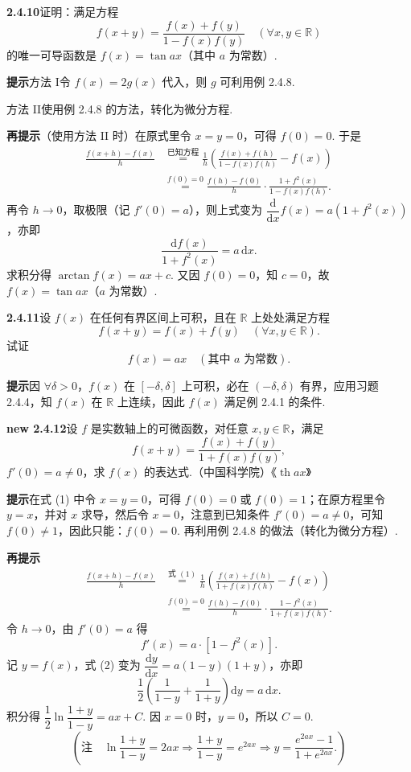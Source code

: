 \documentclass[UTF8,12pt,a4paper,fontset=fandol]{ctexart}
\begin{document}
\noindent\textbf{2.4.10}\quad 证明：满足方程
\[
  f(x+y)=\frac{f(x)+f(y)}{1-f(x)f(y)}\quad(\forall x,y\in\mathbb{R})
\]
的唯一可导函数是 $f(x)=\tan ax$（其中 $a$ 为常数）.

\noindent\textbf{提示}\quad 方法 I\quad 令 $f(x)=2g(x)$ 代入，则 $g$ 可利用例 2.4.8.

方法 II\quad 使用例 2.4.8 的方法，转化为微分方程.

\noindent\textbf{再提示}\quad （使用方法 II 时）在原式里令 $x=y=0$，可得 $f(0)=0$. 于是
\[
\begin{aligned}
\frac{f(x+h)-f(x)}{h}
&\overset{\text{已知方程}}{=}\frac1h\left(\frac{f(x)+f(h)}{1-f(x)f(h)}-f(x)\right)\\
&\overset{f(0)=0}{=}\frac{f(h)-f(0)}{h}\cdot\frac{1+f^2(x)}{1-f(x)f(h)}.
\end{aligned}
\]
再令 $h\to0$，取极限（记 $f'(0)=a$），则上式变为 $\dfrac{\mathrm{d}}{\mathrm{d}x}f(x)=a(1+f^2(x))$，亦即
\[
  \frac{\mathrm{d}f(x)}{1+f^2(x)}=a\,\mathrm{d}x.
\]
求积分得 $\arctan f(x)=ax+c$. 又因 $f(0)=0$，知 $c=0$，故 $f(x)=\tan ax$（$a$ 为常数）.

\noindent\textbf{2.4.11}\quad 设 $f(x)$ 在任何有界区间上可积，且在 $\mathbb{R}$ 上处处满足方程
\[
  f(x+y)=f(x)+f(y)\quad(\forall x,y\in\mathbb{R}).
\]
试证
\[
  f(x)=ax\quad(\text{其中 }a\text{ 为常数}).
\]

\noindent\textbf{提示}\quad 因 $\forall\delta>0$，$f(x)$ 在 $[-\delta,\delta]$ 上可积，必在 $(-\delta,\delta)$ 有界，应用习题 2.4.4，知 $f(x)$ 在 $\mathbb{R}$ 上连续，因此 $f(x)$ 满足例 2.4.1 的条件.

\noindent\textbf{new 2.4.12}\quad 设 $f$ 是实数轴上的可微函数，对任意 $x,y\in\mathbb{R}$，满足
\[
  f(x+y)=\frac{f(x)+f(y)}{1+f(x)f(y)}, \tag{1}
\]
$f'(0)=a\ne0$，求 $f(x)$ 的表达式.（中国科学院）\hfill《$\operatorname{th} ax$》

\noindent\textbf{提示}\quad 在式 (1) 中令 $x=y=0$，可得 $f(0)=0$ 或 $f(0)=1$；在原方程里令 $y=x$，并对 $x$ 求导，然后令 $x=0$，注意到已知条件 $f'(0)=a\ne0$，可知 $f(0)\ne1$，因此只能：$f(0)=0$. 再利用例 2.4.8 的做法（转化为微分方程）.

\noindent\textbf{再提示}\quad
\[
\begin{aligned}
\frac{f(x+h)-f(x)}{h}
&\overset{\text{式 }(1)}{=}\frac1h\left(\frac{f(x)+f(h)}{1+f(x)f(h)}-f(x)\right)\\
&\overset{f(0)=0}{=}\frac{f(h)-f(0)}{h}\cdot\frac{1-f^2(x)}{1+f(x)f(h)}.
\end{aligned}
\]
令 $h\to0$，由 $f'(0)=a$ 得
\[
  f'(x)=a\cdot[1-f^2(x)]. \tag{2}
\]
记 $y=f(x)$，式 (2) 变为 $\dfrac{\mathrm{d}y}{\mathrm{d}x}=a(1-y)(1+y)$，亦即
\[
  \frac12\left(\frac1{1-y}+\frac1{1+y}\right)\mathrm{d}y=a\,\mathrm{d}x.
\]
积分得 $\dfrac12\ln\dfrac{1+y}{1-y}=ax+C$. 因 $x=0$ 时，$y=0$，所以 $C=0$.
\[
  \left(\text{注}\quad \ln\frac{1+y}{1-y}=2ax\Rightarrow\frac{1+y}{1-y}=e^{2ax}\Rightarrow y=\frac{e^{2ax}-1}{1+e^{2ax}}.\right)
\]
\end{document}
